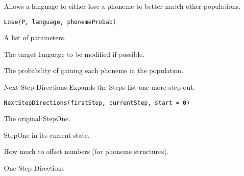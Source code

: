 \documentclass[a4paper]{book}
\begin{document}
%
\begin{Description}\relax
Allows a language to either lose a phoneme to better match other populations.
\end{Description}
%
\begin{Usage}
\begin{verbatim}
Lose(P, language, phonemeProbab)
\end{verbatim}
\end{Usage}
%
\begin{Arguments}
\begin{ldescription}
\item[\code{P}] A list of parameters.

\item[\code{language}] The target language to be modified if possible.

\item[\code{phonemeProbab}] The probability of gaining each phoneme in the population.
\end{ldescription}
\end{Arguments}
%
\begin{Description}\relax
Next Step Directions
Expands the Steps list one more step out.
\end{Description}
%
\begin{Usage}
\begin{verbatim}
NextStepDirections(firstStep, currentStep, start = 0)
\end{verbatim}
\end{Usage}
%
\begin{Arguments}
\begin{ldescription}
\item[\code{firstStep}] The original StepOne.

\item[\code{currentStep}] StepOne in its current state.

\item[\code{start}] How much to offset numbers (for phoneme structures).
\end{ldescription}
\end{Arguments}
%
\begin{Description}\relax
One Step Directions
\end{Description}
\end{document}
